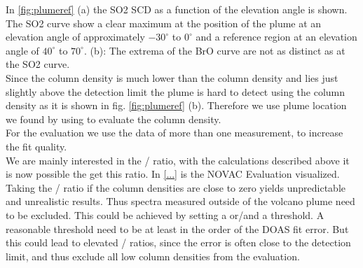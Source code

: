 \documentclass  [
  paper    = a4,
  BCOR     = 10mm,
  twoside,
  fontsize = 12pt,
  fleqn,
  toc      = bibnumbered,
  toc      = listofnumbered,
  numbers  = noendperiod,
  headings = normal,
  listof   = leveldown,
  version  = 3.03
]                                       {scrreprt}
\begin{document}
	In \cref{fig:plumeref} (a) the SO2 SCD as a function of the elevation angle is shown. The SO2 curve show a clear maximum at the position of the plume at an elevation angle of approximately $-30^{\circ}$ to $0^{\circ}$  and a reference region at an elevation angle of $40^{\circ}$ to $70^{\circ}$. (b): The extrema of the BrO curve are not as distinct as at the SO2 curve. \\
	Since the  column density is much lower than the  column density and lies just slightly above the detection limit the plume is hard to detect using the  column density as it is shown in fig. \ref{fig:plumeref} (b). 
	Therefore we use plume location we found by using  to evaluate the  column density.\\
	For the evaluation we use the data of more than one measurement, to increase the fit quality.\\
	We are mainly interested in the / ratio, with the calculations described above it is now possible the get this ratio.
	In \cref{...} is the NOVAC Evaluation visualized.\\
	Taking the / ratio if the column densities are close to zero yields unpredictable and unrealistic results. Thus spectra measured outside of the volcano plume need to be excluded.
	This could be achieved by setting a  or/and a  threshold. A reasonable  threshold need to be at least in the order of the DOAS fit error. But this could lead to elevated / ratios, since the  error is often close to the detection limit, and thus exclude all low  column densities from the evaluation.
\end{document}
